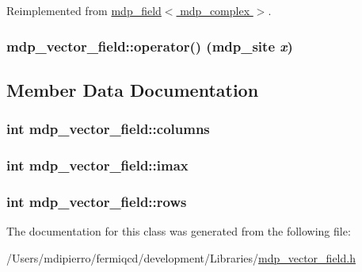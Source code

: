 Reimplemented from \hyperlink{classmdp__field_a9eec94ee723253a196ccc4677832b4a0}{mdp\_\-field$<$ mdp\_\-complex $>$}.\hypertarget{classmdp__vector__field_aaa674fa7253c69257ca593d3854d1672}{
\subsubsection[{operator()}]{ mdp\_\-vector\_\-field::operator() ({\bf mdp\_\-site} {\em x})}}
\label{classmdp__vector__field_aaa674fa7253c69257ca593d3854d1672}


\subsection{Member Data Documentation}
\hypertarget{classmdp__vector__field_a79e671979619905202e5b725dabe41db}{
\subsubsection[{columns}]{\setlength{\rightskip}{0pt plus 5cm}int {\bf mdp\_\-vector\_\-field::columns}}}
\label{classmdp__vector__field_a79e671979619905202e5b725dabe41db}
\hypertarget{classmdp__vector__field_a20e58b016cfd50221192aafc45029dfb}{
\subsubsection[{imax}]{\setlength{\rightskip}{0pt plus 5cm}int {\bf mdp\_\-vector\_\-field::imax}}}
\label{classmdp__vector__field_a20e58b016cfd50221192aafc45029dfb}
\hypertarget{classmdp__vector__field_ace0dc78c30bf473dab2014dac9b56d1d}{
\subsubsection[{rows}]{\setlength{\rightskip}{0pt plus 5cm}int {\bf mdp\_\-vector\_\-field::rows}}}
\label{classmdp__vector__field_ace0dc78c30bf473dab2014dac9b56d1d}


The documentation for this class was generated from the following file:\begin{DoxyCompactItemize}
\item 
/Users/mdipierro/fermiqcd/development/Libraries/\hyperlink{mdp__vector__field_8h}{mdp\_\-vector\_\-field.h}\end{DoxyCompactItemize}
